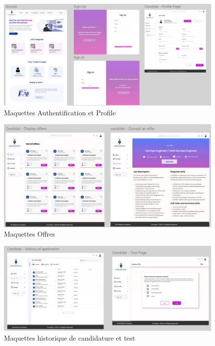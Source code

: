 \begin{figure}[htbp]
   \centering
   \includegraphics[scale=0.8]{Images/1.jpg} %
   \caption{Maquettes Authentification et Profile}
   \label{fig:maquette1}
\end{figure}
\vspace{4cm}
\begin{figure}[htbp]
   \centering
   \includegraphics[scale=0.8]{Images/2.jpg} 
   \caption{Maquettes Offres}
   \label{fig:maquette2}
\end{figure}

\begin{figure}[htbp]
   \centering
   \includegraphics[scale=1]{Images/3.jpg} 
   \caption{Maquettes historique de candidature et test}
   \label{fig:maquette3}
\end{figure}


